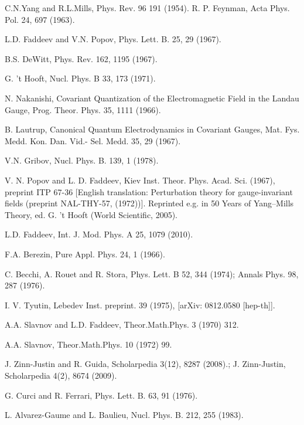 \documentclass[10pt]{article}
\begin{document}
   \begin{thebibliography}{99}

C.N.Yang and R.L.Mills, Phys. Rev. 96  191 (1954).
R. P. Feynman, Acta Phys. Pol. 24, 697 (1963).

 L.D. Faddeev and V.N. Popov, Phys. Lett. B. 25, 29 (1967).

B.S. DeWitt, Phys. Rev. 162, 1195 (1967).

 G. 't Hooft, Nucl. Phys. B 33, 173 (1971).

 N. Nakanishi, Covariant Quantization of the Electromagnetic Field in the Landau Gauge, Prog. Theor.
Phys. 35, 1111 (1966).

 B. Lautrup, Canonical Quantum Electrodynamics in Covariant Gauges, Mat. Fys. Medd. Kon. Dan. Vid.-
Sel. Medd. 35, 29 (1967).


 V.N. Gribov, Nucl. Phys. B. 139, 1 (1978).

V. N. Popov and L. D. Faddeev, Kiev Inst. Theor. Phys. Acad. Sci. (1967),
preprint ITP 67-36 [English translation: Perturbation theory for gauge-invariant fields
(preprint NAL-THY-57, (1972))]. Reprinted e.g. in 50 Years of Yang--Mills Theory,
ed. G. 't Hooft (World Scientific, 2005).

  L.D. Faddeev, Int. J. Mod. Phys. A
 25,  1079  (2010).



 F.A. Berezin, Pure Appl. Phys. 24, 1 (1966).

 C. Becchi, A. Rouet and R. Stora, Phys. Lett. B 52, 344
(1974); Annals Phys. {98}, 287 (1976).

 I. V. Tyutin, Lebedev Inst. preprint. 39 (1975), [arXiv:
0812.0580 [hep-th]].

 A.A. Slavnov and L.D. Faddeev, Theor.Math.Phys. 3 (1970) 312.

A.A. Slavnov, Theor.Math.Phys. 10 (1972) 99.

J. Zinn-Justin and R. Guida, Scholarpedia 3(12), 8287 (2008).;
J. Zinn-Justin, Scholarpedia 4(2), 8674 (2009).



 G. Curci and R. Ferrari, Phys. Lett. B. 63, 91 (1976).

 L. Alvarez-Gaume and L. Baulieu, Nucl. Phys. B. 212, 255
(1983).


\end{thebibliography}
\end{document}

